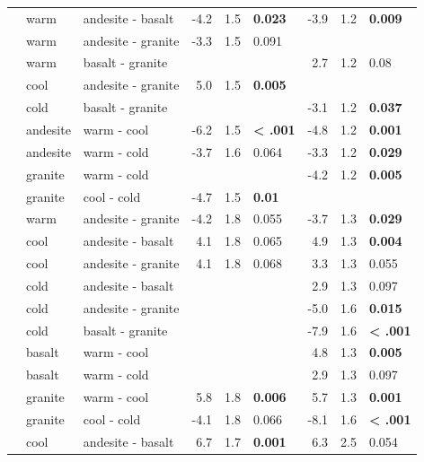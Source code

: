 \documentclass[english,man,floatsintext]{apa6}
\begin{document}
\begin{longtable}[t]{lllrrlrrl}
\endfoot
\bottomrule
\endlastfoot
 & warm & andesite - basalt & -4.2 & 1.5 & \textbf{0.023} & -3.9 & 1.2 & \textbf{0.009}\\
\nopagebreak
 & warm & andesite - granite & -3.3 & 1.5 & 0.091 &  &  & \\
\nopagebreak
 & warm & basalt - granite &  &  &  & 2.7 & 1.2 & 0.08\\
\nopagebreak
 & cool & andesite - granite & 5.0 & 1.5 & \textbf{0.005} &  &  & \\
\nopagebreak
 & cold & basalt - granite &  &  &  & -3.1 & 1.2 & \textbf{0.037}\\
\nopagebreak
 & andesite & warm - cool & -6.2 & 1.5 & \textbf{< .001} & -4.8 & 1.2 & \textbf{0.001}\\
\nopagebreak
 & andesite & warm - cold & -3.7 & 1.6 & 0.064 & -3.3 & 1.2 & \textbf{0.029}\\
\nopagebreak
 & granite & warm - cold &  &  &  & -4.2 & 1.2 & \textbf{0.005}\\
\nopagebreak
\multirow[t]{-9}{*}{\raggedright\arraybackslash 0-10cm} & granite & cool - cold & -4.7 & 1.5 & \textbf{0.01} &  &  & \\
\cmidrule{1-9}\pagebreak[0]
 & warm & andesite - granite & -4.2 & 1.8 & 0.055 & -3.7 & 1.3 & \textbf{0.029}\\
\nopagebreak
 & cool & andesite - basalt & 4.1 & 1.8 & 0.065 & 4.9 & 1.3 & \textbf{0.004}\\
\nopagebreak
 & cool & andesite - granite & 4.1 & 1.8 & 0.068 & 3.3 & 1.3 & 0.055\\
\nopagebreak
 & cold & andesite - basalt &  &  &  & 2.9 & 1.3 & 0.097\\
\nopagebreak
 & cold & andesite - granite &  &  &  & -5.0 & 1.6 & \textbf{0.015}\\
\nopagebreak
 & cold & basalt - granite &  &  &  & -7.9 & 1.6 & \textbf{< .001}\\
\nopagebreak
 & basalt & warm - cool &  &  &  & 4.8 & 1.3 & \textbf{0.005}\\
\nopagebreak
 & basalt & warm - cold &  &  &  & 2.9 & 1.3 & 0.097\\
\nopagebreak
 & granite & warm - cool & 5.8 & 1.8 & \textbf{0.006} & 5.7 & 1.3 & \textbf{0.001}\\
\nopagebreak
\multirow[t]{-10}{*}{\raggedright\arraybackslash 10-20cm} & granite & cool - cold & -4.1 & 1.8 & 0.066 & -8.1 & 1.6 & \textbf{< .001}\\
\cmidrule{1-9}\pagebreak[0]
 & cool & andesite - basalt & 6.7 & 1.7 & \textbf{0.001} & 6.3 & 2.5 & 0.054\\

\end{longtable}
\end{document}
